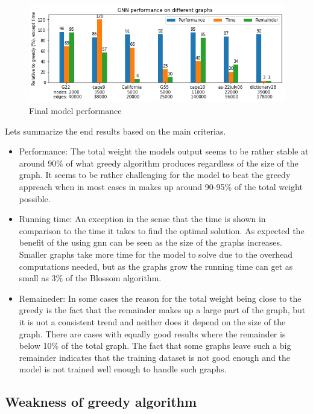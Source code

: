 \begin{figure}[H]
    \centering
    \includegraphics[scale=0.8]{figures/FINALResults}
    \caption{Final model performance}
    \label{final model performance}
\end{figure}

Lets summarize the end results based on the main criterias.
\begin{itemize}
\item Performance: The total weight the models output seems to be rather stable at around 90\% of what greedy algorithm produces regardless of the size of the graph. It seems to be rather challenging for the model to beat the greedy appreach when in most cases in makes up around 90-95\% of the total weight possible.
\item Running time: An exception in the sense that the time is shown in comparison to the time it takes to find the optimal solution. As expected the benefit of the using \gls{gnn} can be seen as the size of the graphs increases. Smaller graphs take more time for the model to solve due to the overhead computations needed, but as the graphs grow the running time can get as small as 3\% of the Blossom algorithm.
\item Remaineder: In some cases the reason for the total weight being close to the greedy is the fact that the remainder makes up a large part of the graph, but it is not a consistent trend and neither does it depend on the size of the graph. There are cases with equally good results where the remainder is below 10\% of the total graph. The fact that some graphs leave such a big remainder indicates that the training dataset is not good enough and the model is not trained well enough to handle such graphs.
\end{itemize}

\subsection{Weakness of greedy algorithm}

